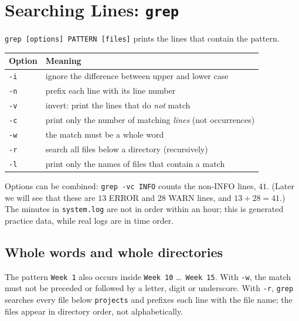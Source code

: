 \documentclass[11pt,a4paper]{article}
\newcommand{\cmd}[1]{\texttt{#1}}
\begin{document}
\section{Searching Lines: \texttt{grep}}
\label{sec:grep}

\cmd{grep [options] PATTERN [files]} prints the lines that contain the pattern.



\begin{center}
\renewcommand{\arraystretch}{1.2}
\begin{tabular}{@{}lp{11.5cm}@{}}
\toprule
\textbf{Option} & \textbf{Meaning}\\
\midrule
\cmd{-i} & ignore the difference between upper and lower case\\
\cmd{-n} & prefix each line with its line number\\
\cmd{-v} & invert: print the lines that do \emph{not} match\\
\cmd{-c} & print only the number of matching \emph{lines} (not occurrences)\\
\cmd{-w} & the match must be a whole word\\
\cmd{-r} & search all files below a directory (recursively)\\
\cmd{-l} & print only the names of files that contain a match\\
\bottomrule
\end{tabular}
\end{center}

Options can be combined: \cmd{grep -vc INFO} counts the non-INFO lines, $41$. (Later we will see that these are $13$ ERROR and $28$ WARN lines, and $13 + 28 = 41$.) The minutes in \texttt{system.log} are not in order within an hour; this is generated practice data, while real logs are in time order.

\subsection{Whole words and whole directories}



The pattern \texttt{Week 1} also occurs inside \texttt{Week 10} \dots\ \texttt{Week 15}. With \cmd{-w}, the match must not be preceded or followed by a letter, digit or underscore. With \cmd{-r}, \cmd{grep} searches every file below \texttt{projects} and prefixes each line with the file name; the files appear in directory order, not alphabetically.
\end{document}
